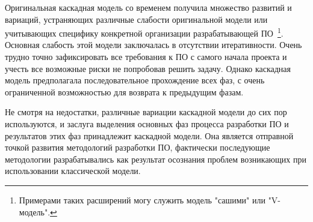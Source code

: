 Оригинальная каскадная модель со временем получила множество развитий и вариаций, устраняющих различные слабости оригинальной модели или учитывающих специфику конкретной организации разрабатывающей ПО~\footnote{Примерами таких расширений могу служить модель "сашими" или "V-модель".}. Основная слабость этой модели заключалась в отсутствии итеративности. Очень трудно точно зафиксировать все требования к ПО с самого начала проекта и учесть все возможные риски не попробовав решить задачу. Однако каскадная модель предполагала последовательное прохождение всех фаз, с очень ограниченной возможностью для возврата к предыдущим фазам.

Не смотря на недостатки, различные вариации каскадной модели до сих пор используются, и заслуга выделения основных фаз процесса разработки ПО и результатов этих фаз принадлежит каскадной модели. Она является отправной точкой развития методологий разработки ПО, фактически последующие методологии разрабатывались как результат осознания проблем возникающих при использовании классической модели.
